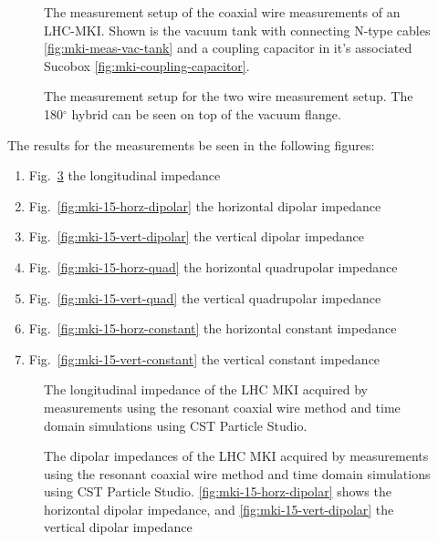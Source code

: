 \begin{figure}
\subfigure[]{
\label{fig:mki-meas-vac-tank}
}
\subfigure[]{
\label{fig:mki-coupling-capacitor}
}
\label{fig:mki-meas-setup}
\caption{The measurement setup of the coaxial wire measurements of an LHC-MKI. Shown is the vacuum tank with connecting N-type cables \ref{fig:mki-meas-vac-tank} and a coupling capacitor in it's associated Sucobox \ref{fig:mki-coupling-capacitor}.}
\end{figure}

\begin{figure}
\label{fig:mki-meas-two-wire}
\caption{The measurement setup for the two wire measurement setup. The 180$^{\circ}$ hybrid can be seen on top of the vacuum flange.}
\end{figure}

The results for the measurements be seen in the following figures:
\begin{enumerate}
\item{Fig.~\ref{fig:mki-15-longitudinal} the longitudinal impedance}
\item{Fig.~\ref{fig:mki-15-horz-dipolar} the horizontal dipolar impedance}
\item{Fig.~\ref{fig:mki-15-vert-dipolar} the vertical dipolar impedance}
\item{Fig.~\ref{fig:mki-15-horz-quad} the horizontal quadrupolar impedance}
\item{Fig.~\ref{fig:mki-15-vert-quad} the vertical quadrupolar impedance}
\item{Fig.~\ref{fig:mki-15-horz-constant} the horizontal constant impedance}
\item{Fig.~\ref{fig:mki-15-vert-constant} the vertical constant impedance}
\end{enumerate}

\begin{figure}
\label{fig:mki-15-longitudinal}
\caption{The longitudinal impedance of the LHC MKI acquired by measurements using the resonant coaxial wire method and time domain simulations using CST Particle Studio.}
\end{figure}

\begin{figure}
\subfigure[]{
\label{fig:mki-15-horz-dipolar}
}
\subfigure[]{
\label{fig:mki-15-vert-dipolar}
}
\label{fig:mki-15-dipolar}
\caption{The dipolar impedances of the LHC MKI acquired by measurements using the resonant coaxial wire method and time domain simulations using CST Particle Studio. \ref{fig:mki-15-horz-dipolar} shows the horizontal dipolar impedance, and \ref{fig:mki-15-vert-dipolar} the vertical dipolar impedance}
\end{figure}

